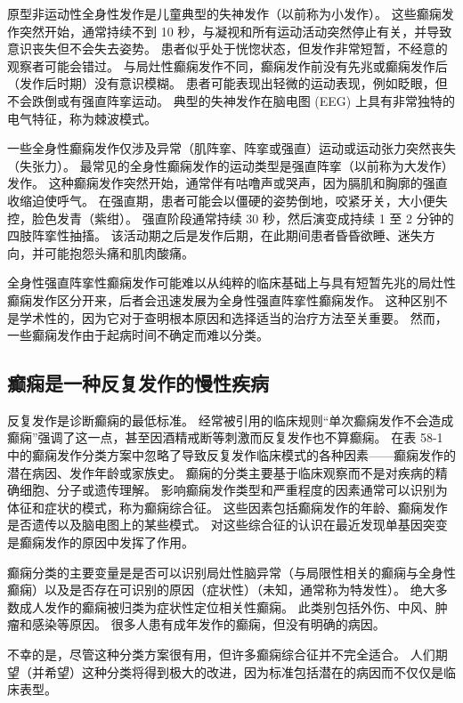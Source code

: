 原型非运动性全身性发作是儿童典型的失神发作（以前称为小发作）。
这些癫痫发作突然开始，通常持续不到 10 秒，与凝视和所有运动活动突然停止有关，并导致意识丧失但不会失去姿势。
患者似乎处于恍惚状态，但发作非常短暂，不经意的观察者可能会错过。
与局灶性癫痫发作不同，癫痫发作前没有先兆或癫痫发作后（发作后时期）没有意识模糊。
患者可能表现出轻微的运动表现，例如眨眼，但不会跌倒或有强直阵挛运动。
典型的失神发作在脑电图 (EEG) 上具有非常独特的电气特征，称为棘波模式。


一些全身性癫痫发作仅涉及异常（肌阵挛、阵挛或强直）运动或运动张力突然丧失（失张力）。
最常见的全身性癫痫发作的运动类型是强直阵挛（以前称为大发作）发作。
这种癫痫发作突然开始，通常伴有咕噜声或哭声，因为膈肌和胸廓的强直收缩迫使呼气。
在强直期，患者可能会以僵硬的姿势倒地，咬紧牙关，大小便失控，脸色发青（紫绀）。
强直阶段通常持续 30 秒，然后演变成持续 1 至 2 分钟的四肢阵挛性抽搐。
该活动期之后是发作后期，在此期间患者昏昏欲睡、迷失方向，并可能抱怨头痛和肌肉酸痛。


全身性强直阵挛性癫痫发作可能难以从纯粹的临床基础上与具有短暂先兆的局灶性癫痫发作区分开来，后者会迅速发展为全身性强直阵挛性癫痫发作。
这种区别不是学术性的，因为它对于查明根本原因和选择适当的治疗方法至关重要。
然而，一些癫痫发作由于起病时间不确定而难以分类。



\subsection{癫痫是一种反复发作的慢性疾病}

反复发作是诊断癫痫的最低标准。
经常被引用的临床规则“单次癫痫发作不会造成癫痫”强调了这一点，甚至因酒精戒断等刺激而反复发作也不算癫痫。
在表 58-1 中的癫痫发作分类方案中忽略了导致反复发作临床模式的各种因素——癫痫发作的潜在病因、发作年龄或家族史。
癫痫的分类主要基于临床观察而不是对疾病的精确细胞、分子或遗传理解。
影响癫痫发作类型和严重程度的因素通常可以识别为体征和症状的模式，称为癫痫综合征。
这些因素包括癫痫发作的年龄、癫痫发作是否遗传以及脑电图上的某些模式。
对这些综合征的认识在最近发现单基因突变是癫痫发作的原因中发挥了作用。


癫痫分类的主要变量是是否可以识别局灶性脑异常（与局限性相关的癫痫与全身性癫痫）以及是否存在可识别的原因（症状性）（未知，通常称为特发性）。
绝大多数成人发作的癫痫被归类为症状性定位相关性癫痫。
此类别包括外伤、中风、肿瘤和感染等原因。
很多人患有成年发作的癫痫，但没有明确的病因。


不幸的是，尽管这种分类方案很有用，但许多癫痫综合征并不完全适合。
人们期望（并希望）这种分类将得到极大的改进，因为标准包括潜在的病因而不仅仅是临床表型。



